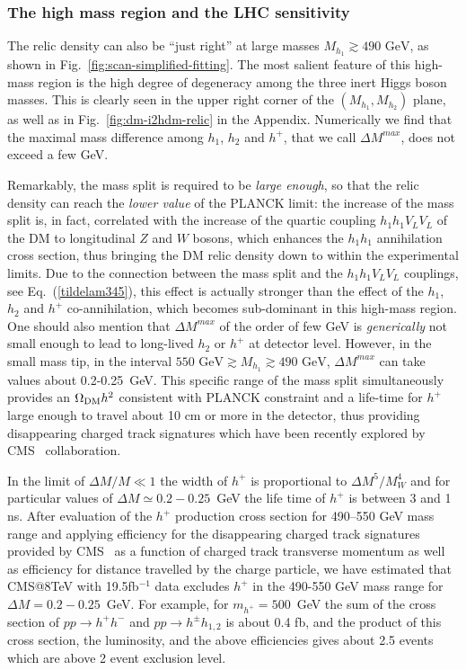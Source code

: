 \documentclass[12pt,a4paper]{article}
\newcommand {\blue} {\color{blue}}
\begin{document}
\subsubsection{The high mass region and the LHC sensitivity}

{\blue 
The relic density can also be ``just right'' at large masses $M_{h_1}\gtrsim 490\mbox{ GeV}$, as shown in Fig.~\ref{fig:scan-simplified-fitting}. 
The most salient feature of this high-mass region is the high degree of degeneracy among the three inert Higgs boson masses.
This is clearly seen in the upper right corner of the $(M_{h_1},M_{h_2})$ plane, as well as in
Fig.~\ref{fig:dm-i2hdm-relic} in the Appendix. Numerically we find that the
maximal mass difference among $h_1$, $h_2$ and $h^+$, that we call $\Delta M^{max}$, does not exceed a few GeV. }

Remarkably, the mass split is required to be {\it large enough}, so that the relic density can reach the {\it lower value} of the PLANCK limit: the increase of  the mass
split is, in fact, correlated with the increase of the quartic coupling $h_1 h_1 V_L V_L$ of the DM to longitudinal $Z$ and $W$ bosons,
which enhances the $h_1 h_1$ annihilation cross section, thus bringing
the DM relic density down to within the experimental limits. Due to the connection between the mass split and the $h_1 h_1 V_L V_L$ couplings, 
see Eq.~(\ref{tildelam345}),
this effect is actually stronger than the effect of the
$h_1$, $h_2$ and $h^+$ co-annihilation, which becomes sub-dominant in this high-mass region.
One should also mention that  $\Delta M^{max}$ of the order of few GeV  is {\it generically} not 
small enough to lead to long-lived $h_2$ or $h^+$ at detector level.
However, in the small mass tip, in the interval
$550\mbox{ GeV} \gtrsim M_{h_1}\gtrsim 490\mbox{ GeV}$,  $\Delta M^{max}$ can take values 
about 0.2-0.25~GeV. This specific range of the mass split simultaneously provides an $\Omega_{\rm DM} h^2$ consistent with 
PLANCK constraint and a life-time for $h^+$ large enough to travel about 10 cm or more in the  detector, thus
providing disappearing charged track signatures which have been recently explored  by  CMS~\cite{CMS:2014gxa}
collaboration.

In the limit of $\Delta M/M\ll 1$ the width of  $h^+$ is proportional to  $\Delta M^5/M_W^4$
and for particular values of $\Delta M\simeq 0.2-0.25$~GeV the  life time of  $h^+$ is between 3 and 1 ns.
After evaluation of the  $h^+$ production cross section for  490--550 GeV mass range
and applying efficiency for the  disappearing charged track signatures provided by  CMS~\cite{CMS:2014gxa}
as a function of charged track transverse momentum as well as efficiency for distance travelled by the charge particle,
we have estimated  that CMS@8TeV with 19.5fb$^{-1}$ data excludes  $h^+$  in the 490-550 GeV mass range for   $\Delta M=0.2-0.25$~GeV.
For example, for $m_{h^+}=500$~GeV the sum of the cross section of $pp\to{h^+}{h^-}$ and  $pp\to{h^\pm}{h_{1,2}}$
is about 0.4 fb, and the product of this cross section, the luminosity, and the above efficiencies gives about 2.5 events
which are above 2 event exclusion level.
\end{document}
